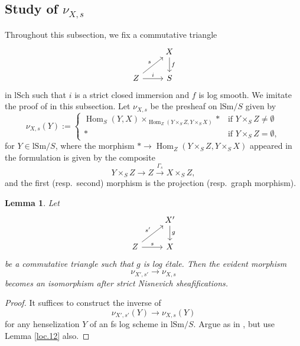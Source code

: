 \documentclass[10pt]{amsart}
\newtheorem{lem}[thm]{Lemma}
\theoremstyle{definition}
\theoremstyle{remark}
\numberwithin{equation}{subsection}
\DeclareMathOperator{\Hom}{Hom}
\newcommand{\lSch}{\mathrm{lSch}}
\newcommand{\lSm}{\mathrm{lSm}}
\begin{document}
\subsection{Study of \texorpdfstring{$\nu_{X,s}$}{PsiXs}}
\label{study}
Throughout this subsection, we fix a commutative triangle
\[
\begin{tikzcd}
&X\ar[d,"f"]
\\
Z\ar[ru,"s"]\ar[r,"i"]&
S
\end{tikzcd}
\]
in $\lSch$ such that $i$ is a strict closed immersion and $f$ is log smooth.
We imitate the proof of \cite[Proposition 4.5.42]{Ayo072} in this subsection.
Let $\nu_{X,s}$ be the presheaf on $\lSm/S$ given by
\[
\nu_{X,s}(Y)
:=
\left\{
\begin{array}{ll}
\Hom_S(Y,X)\times_{\Hom_Z(Y\times_S Z,Y\times_S X)}*&\text{if }Y\times_S Z\neq \emptyset
\\
* &\text{if }Y\times_S Z= \emptyset,
\end{array}
\right.
\]
for $Y\in \lSm/S$, where the morphism $*\to \Hom_Z(Y\times_S Z,Y\times_S X)$ appeared in the formulation is given by the composite
\[
Y\times_S Z \to Z \xrightarrow{\Gamma_s} X\times_S Z,
\]
and the first (resp.\ second) morphism is the projection (resp.\ graph morphism).



\begin{lem}
\label{loc.5}
Let
\[
\begin{tikzcd}
&X'\arrow[d,"g"]\\
Z\arrow[ru,"s'"]\arrow[r,"s"]&X
\end{tikzcd}
\]
be a commutative triangle such that $g$ is log \'etale.
Then the evident morphism
\[
\nu_{X',s'}\rightarrow \nu_{X,s}
\]
becomes an isomorphism after strict Nisnevich sheafifications. 
\end{lem}
\begin{proof}
It suffices to construct the inverse of
\begin{equation}
\label{loc.5.1}
\nu_{X',s'}(Y)\rightarrow \nu_{X,s}(Y)
\end{equation}
for any henselization $Y$ of an fs log scheme in $\lSm/S$.
Argue as in \cite[\'{E}tape 2 in Proposition 4.5.42]{Ayo072},
but use Lemma \ref{loc.12} also.
\end{proof}
\end{document}

